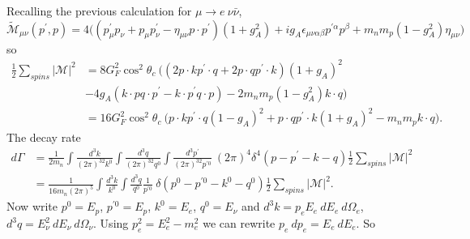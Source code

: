 \documentclass[a4paper,12pt]{article}
\begin{document}
Recalling the previous calculation for $\mu \to e\ \nu \bar{\nu}$, 
\begin{equation}
\tilde{\mathcal{M}}_{\mu\nu}(p^\prime,p) = 4\bigg((p_\mu^\prime p_\nu + p_\mu p_\nu^\prime - \eta_{\mu\nu} p \cdot p^\prime)(1+g_A^2) + i g_A \epsilon_{\mu\nu\alpha\beta}p^{\prime \alpha}p^\beta + m_n m_p(1-g_A^2)\eta_{\mu\nu}\bigg)
\end{equation}
so
\begin{equation}
\begin{split}
\frac{1}{2}\sum_{spins}|\mathcal{M}|^2 &= 8 G_F^2\cos^2\theta_c\ \bigg((2p\cdot k p^\prime \cdot q + 2 p\cdot q p^\prime \cdot k)(1+g_A)^2 \\
&- 4g_A(k\cdot p q\cdot p^\prime - k\cdot p^\prime q\cdot p) - 2 m_n m_p(1-g_A^2)k \cdot q\bigg)\\
&= 16G_F^2\cos^2\theta_c\ \bigg(p\cdot k p^\prime \cdot q (1-g_A)^2 + p\cdot q p^\prime \cdot k (1+ g_A)^2 - m_n m_p k \cdot q \bigg).
\end{split}
\end{equation}
The decay rate
\begin{equation}
\begin{split}
d\Gamma &= \frac{1}{2m_n} \int\frac{d^3k}{(2\pi)^32k^0} \int\frac{d^3q}{(2\pi)^32q^0} \int\frac{d^3p^\prime}{(2\pi)^32p^{\prime 0}}\ (2\pi)^4 \delta^4(p - p^\prime -k - q)\frac{1}{2}\sum_{spins}|\mathcal{M}|^2 \\
&= \frac{1}{16m_n(2\pi)^5}\int\frac{d^3k}{k^0} \int\frac{d^3q}{q^0}\frac{1}{p^{\prime 0}}\ \delta(p^0 - p^{\prime 0} - k^0 - q^0) \frac{1}{2}\sum_{spins}|\mathcal{M}|^2.
\end{split}
\end{equation}
Now write $p^0 = E_p$, $p^{\prime 0} = E_p$, $k^0 = E_e$, $q^0 = E_\nu$ and $d^3k = p_e E_e\ dE_e\ d\Omega_e$, $d^3q = E_\nu^2\ dE_\nu\ d\Omega_\nu$. Using $p_e^2 = E_e^2 - m_e^2$ we can rewrite $p_e\ dp_e = E_e\ dE_e$. So
\end{document}
